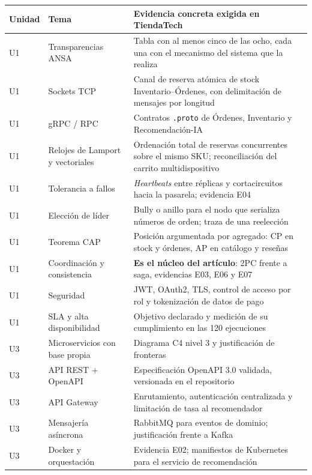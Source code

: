 \documentclass[11pt,a4paper]{article}
\begin{document}
\begin{center}
	\footnotesize
	\begin{longtable}{@{}p{1.2cm}p{5.4cm}p{8.2cm}@{}}
		\toprule
		\textbf{Unidad} & \textbf{Tema} & \textbf{Evidencia concreta exigida en TiendaTech} \\
		\midrule
		\endhead
		U1 & Transparencias ANSA & Tabla con al menos cinco de las ocho, cada una con el mecanismo del sistema que la realiza \\
		U1 & Sockets TCP & Canal de reserva atómica de stock Inventario--Órdenes, con delimitación de mensajes por longitud \\
		U1 & gRPC / RPC & Contratos \texttt{.proto} de Órdenes, Inventario y Recomendación-IA \\
		U1 & Relojes de Lamport y vectoriales & Ordenación total de reservas concurrentes sobre el mismo SKU; reconciliación del carrito multidispositivo \\
		U1 & Tolerancia a fallos & \emph{Heartbeats} entre réplicas y cortacircuitos hacia la pasarela; evidencia E04 \\
		U1 & Elección de líder & Bully o anillo para el nodo que serializa números de orden; traza de una reelección \\
		U1 & Teorema CAP & Posición argumentada por agregado: CP en stock y órdenes, AP en catálogo y reseñas \cite{gilbert2002brewer} \\
		U1 & Coordinación y consistencia & \textbf{Es el núcleo del artículo}: 2PC frente a saga, evidencias E03, E06 y E07 \cite{garciamolina1987sagas,gray2006consensus} \\
		U1 & Seguridad & JWT, OAuth2, TLS, control de acceso por rol y tokenización de datos de pago \\
		U1 & SLA y alta disponibilidad & Objetivo declarado y medición de su cumplimiento en las 120 ejecuciones \\
		\addlinespace
		U3 & Microservicios con base propia & Diagrama C4 nivel 3 y justificación de fronteras \cite{difrancesco2019architecting} \\
		U3 & API REST + OpenAPI & Especificación OpenAPI 3.0 validada, versionada en el repositorio \\
		U3 & API Gateway & Enrutamiento, autenticación centralizada y limitación de tasa al recomendador \\
		U3 & Mensajería asíncrona & RabbitMQ para eventos de dominio; justificación frente a Kafka \\
		U3 & Docker y orquestación & Evidencia E02; manifiestos de Kubernetes para el servicio de recomendación \\

\end{longtable}
\end{center}
\end{document}
